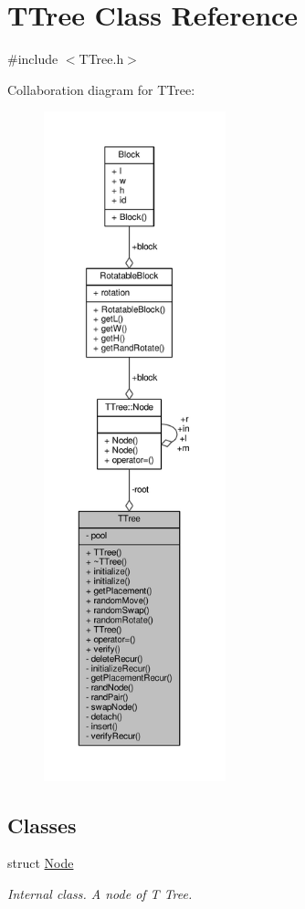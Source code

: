 \hypertarget{classTTree}{}\section{T\+Tree Class Reference}
\label{classTTree}


{\ttfamily \#include $<$T\+Tree.\+h$>$}



Collaboration diagram for T\+Tree\+:\nopagebreak
\begin{figure}[H]
\begin{center}
\leavevmode
\includegraphics[height=550pt]{classTTree__coll__graph}
\end{center}
\end{figure}
\subsection*{Classes}
\begin{DoxyCompactItemize}
\item 
struct \hyperlink{structTTree_1_1Node}{Node}
\begin{DoxyCompactList}\small\item\em Internal class. A node of T Tree. \end{DoxyCompactList}\end{DoxyCompactItemize}
